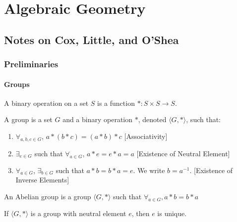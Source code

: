 \chapter{Algebraic Geometry}
    \section{Notes on Cox, Little, and O'Shea}
        \subsection{Preliminaries}
            \subsubsection{Groups}
                \begin{definition}
                    A binary operation on a set $S$ is a
                    function $*:S\times S \rightarrow S$.
                \end{definition}
                \begin{definition}
                    A group is a set $G$ and a binary operation $*$,
                    denoted $\langle G,*\rangle$, such that:
                    \begin{enumerate}
                        \item $\forall_{a,b,c\in G}$, $a*(b*c)=(a*b)*c$
                              \hfill[Associativity]
                        \item $\exists_{e\in G}$ such that
                              $\forall_{a\in G}$, $a*e=e*a=a$
                              \hfill[Existence of Neutral Element]
                        \item $\forall_{a\in G}$, $\exists_{b\in G}$
                              such that $a*b=b*a=e$.
                              We write $b=a^{-1}$.
                              \hfill[Existence of Inverse Elements]
                    \end{enumerate}
                \end{definition}
                \begin{definition}
                    An Abelian group is a group $\langle G,*\rangle$
                    such that $\forall_{a\in G},a*b=b*a$
                \end{definition}
                \begin{theorem}
                    If $\langle G, *\rangle$ is a group with neutral
                    element $e$, then $e$ is unique.
                \end{theorem}
